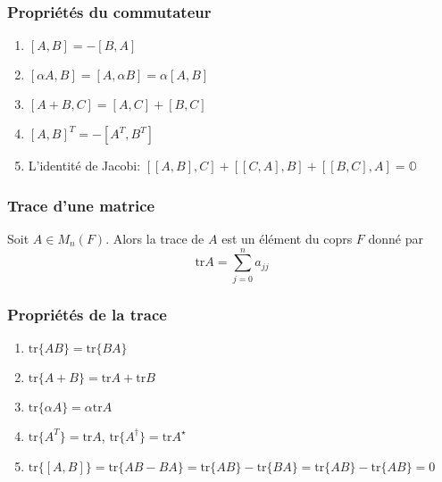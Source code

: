 \subsubsection{Propriétés du commutateur}
\begin{enumerate}
    \item $[A, B] = -[B, A]$
    \item $[\alpha A, B ] = [A, \alpha B] = \alpha [A, B]$
    \item $[A + B, C] = [A, C] + [B, C]$
    \item $[A, B]^T = -[A^T, B^T]$
    \item L'identité de Jacobi: $[[A, B], C] + [[C, A], B] + [[B, C], A] = \mathbb{O}$
\end{enumerate}

\subsubsection{Trace d'une matrice}
Soit $A \in M_n(F)$. Alors la trace de $A$ est un élément du coprs $F$ donné par
\[ \text{tr}A =  \sum_{j = 0}^{n} a_{jj} \]

\subsubsection{Propriétés de la trace}
\begin{enumerate}
    \item $\text{tr}\{ AB \} = \text{tr}\{ BA \}$
    \item $\text{tr}\{ A + B \} = \text{tr}A + \text{tr}B$
    \item $\text{tr}\{ \alpha A \} = \alpha \text{tr}A $
    \item $\text{tr}\{ A^T \} = \text{tr}A$, $\text{tr}\{ A^\dagger \} = \text{tr}A^\star$
    \item $\text{tr}\{ [A, B] \} = \text{tr}\{ AB - BA \} = \text{tr}\{ AB \} - \text{tr}\{BA\} = \text{tr}\{ AB \} - \text{tr}\{AB\} = 0$
\end{enumerate}

